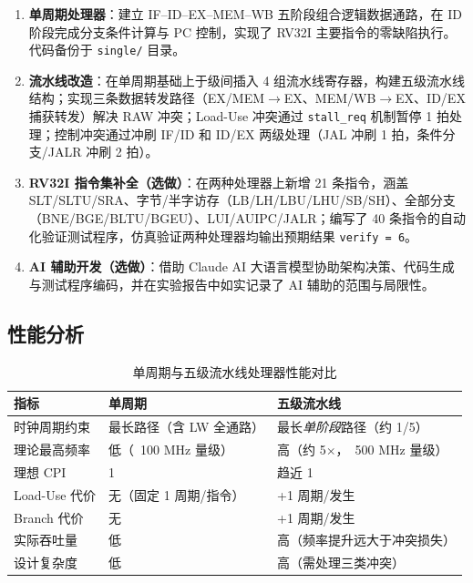 \documentclass[12pt,hyperref,a4paper,UTF8]{ctexart}
\begin{document}
\begin{enumerate}[leftmargin=2em]
    \item \textbf{单周期处理器}：建立 IF--ID--EX--MEM--WB 五阶段组合逻辑数据通路，在 ID 阶段完成分支条件计算与 PC 控制，实现了 RV32I 主要指令的零缺陷执行。代码备份于 \texttt{single/} 目录。

    \item \textbf{流水线改造}：在单周期基础上于级间插入 4 组流水线寄存器，构建五级流水线结构；实现三条数据转发路径（EX/MEM$\rightarrow$EX、MEM/WB$\rightarrow$EX、ID/EX 捕获转发）解决 RAW 冲突；Load-Use 冲突通过 \texttt{stall\_req} 机制暂停 1 拍处理；控制冲突通过冲刷 IF/ID 和 ID/EX 两级处理（JAL 冲刷 1 拍，条件分支/JALR 冲刷 2 拍）。

    \item \textbf{RV32I 指令集补全（选做）}：在两种处理器上新增 21 条指令，涵盖 SLT/SLTU/SRA、字节/半字访存（LB/LH/LBU/LHU/SB/SH）、全部分支（BNE/BGE/BLTU/BGEU）、LUI/AUIPC/JALR；编写了 40 条指令的自动化验证测试程序，仿真验证两种处理器均输出预期结果 \texttt{verify = 6}。

    \item \textbf{AI 辅助开发（选做）}：借助 Claude AI 大语言模型协助架构决策、代码生成与测试程序编码，并在实验报告中如实记录了 AI 辅助的范围与局限性。
\end{enumerate}

\subsection{性能分析}

\begin{table}[H]
    \centering
    \caption{单周期与五级流水线处理器性能对比}
    \label{tab:perf_compare}
    \begin{tabular}{lll}
        \toprule
        指标 & 单周期 & 五级流水线 \\
        \midrule
        时钟周期约束 & 最长路径（含 LW 全通路） & 最长\emph{单阶段}路径（约 1/5） \\
        理论最高频率 & 低（~100 MHz 量级） & 高（约 5$\times$，~500 MHz 量级） \\
        理想 CPI & 1 & 趋近 1 \\
        Load-Use 代价 & 无（固定 1 周期/指令） & +1 周期/发生 \\
        Branch 代价 & 无 & +1 周期/发生 \\
        实际吞吐量 & 低 & 高（频率提升远大于冲突损失） \\
        设计复杂度 & 低 & 高（需处理三类冲突） \\
        \bottomrule
    \end{tabular}
\end{table}
\end{document}
